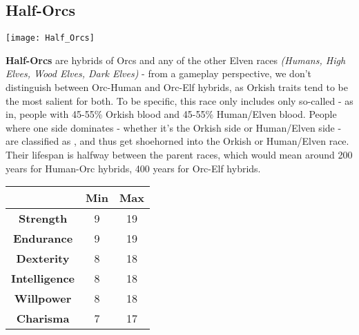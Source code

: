 \subsection{Half-Orcs}


\texttt{[image: Half\_Orcs]}


\textbf{Half-Orcs} are hybrids of Orcs and any of the other Elven races \textit{(Humans, High Elves, Wood Elves, Dark Elves)} - from a gameplay perspective, we don't distinguish between Orc-Human and Orc-Elf hybrids, as Orkish traits tend to be the most salient for both. To be specific, this race only includes only so-called - as in, people with 45-55\% Orkish blood and 45-55\% Human/Elven blood. People where one side dominates - whether it's the Orkish side or Human/Elven side - are classified as , and thus get shoehorned into the Orkish or Human/Elven race. Their lifespan is halfway between the parent races, which would mean around 200 years for Human-Orc hybrids, 400 years for Orc-Elf hybrids.


\begin{tabular}{|c|c|c|}
\hline
 & \textbf{Min} & \textbf{Max} \\ \hline
\textbf{Strength} & 9 & 19 \\ \hline
\textbf{Endurance} & 9 & 19 \\ \hline
\textbf{Dexterity} & 8 & 18 \\ \hline
\textbf{Intelligence} & 8 & 18 \\ \hline
\textbf{Willpower} & 8 & 18 \\ \hline
\textbf{Charisma} & 7 & 17 \\ \hline
\end{tabular}


\newpage
